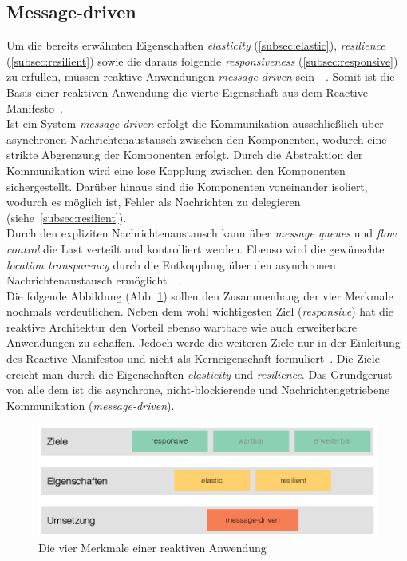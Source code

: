 \subsection{Message-driven}\label{subsec:messagedriven}
Um die bereits erwähnten Eigenschaften \textit{elasticity} (\ref{subsec:elastic}), \textit{resilience} (\ref{subsec:resilient}) sowie die daraus folgende \textit{responsiveness} (\ref{subsec:responsive}) zu erfüllen, müssen reaktive Anwendungen \textit{message-driven} sein~\cite{webber_what_2014}~\cite[S.~43]{kuhn_reactive_2015}. Somit ist die Basis einer reaktiven Anwendung die vierte Eigenschaft aus dem Reactive Manifesto~\cite{boner_reactive_2014}.\\
Ist ein System \textit{message-driven} erfolgt die Kommunikation ausschließlich über asynchronen Nachrichtenaustausch zwischen den Komponenten, wodurch eine strikte Abgrenzung der Komponenten erfolgt. Durch die Abstraktion der Kommunikation wird eine lose Kopplung zwischen den Komponenten sichergestellt. Darüber hinaus sind die Komponenten voneinander isoliert, wodurch es möglich ist, Fehler als Nachrichten zu delegieren (siehe~\ref{subsec:resilient}).\\
Durch den expliziten Nachrichtenaustausch kann über \textit{message queues} und \textit{flow control} die Last verteilt und kontrolliert werden. Ebenso wird die gewünschte \textit{location transparency} durch die Entkopplung über den asynchronen Nachrichtenaustausch ermöglicht~\cite{boner_reactive_2015}~\cite[S.~43]{kuhn_reactive_2015}.\\
Die folgende Abbildung (Abb. \ref{fig:four-traits}) sollen den Zusammenhang der vier Merkmale nochmals verdeutlichen. Neben dem wohl wichtigesten Ziel (\textit{responsive}) hat die reaktive Architektur den Vorteil ebenso wartbare wie auch erweiterbare Anwendungen zu schaffen. Jedoch werde die weiteren Ziele nur in der Einleitung des Reactive Manifestos und nicht als Kerneigenschaft formuliert~\cite{boner_reactive_2014}. Die Ziele ereicht man durch die Eigenschaften \textit{elasticity} und \textit{resilience}. Das Grundgerust von alle dem ist die asynchrone, nicht-blockierende und Nachrichtengetriebene Kommunikation (\textit{message-driven}).

\begin{figure}[H]
 \centering
 \includegraphics[width=1.0\textwidth]{3-Grundlagen/four-traits/four-traits.eps}
 \caption{Die vier Merkmale einer reaktiven Anwendung \cite{kuhn_code_2015}}
 \label{fig:four-traits}
\end{figure}

